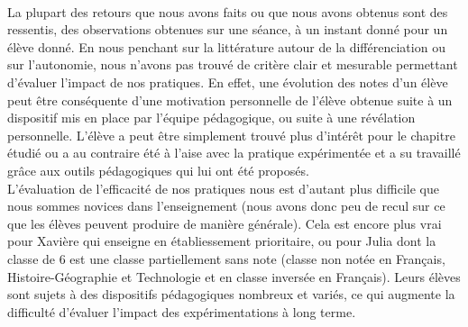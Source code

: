 \paragraph*{} La plupart des retours que nous avons faits ou que nous avons obtenus sont des ressentis, des observations obtenues sur une séance, à un instant donné pour un élève donné. En nous penchant sur la littérature autour de la différenciation ou sur l'autonomie, nous n'avons pas trouvé de critère clair et mesurable permettant d'évaluer l'impact de nos pratiques. En effet, une évolution des notes d'un élève peut être conséquente d'une motivation personnelle de l'élève obtenue suite à un dispositif mis en place par l'équipe pédagogique, ou suite à une révélation personnelle. L'élève a peut être simplement trouvé plus d'intérêt pour le chapitre étudié ou a au contraire été à l'aise avec la pratique expérimentée et a su travaillé grâce aux outils pédagogiques qui lui ont été proposés.\\
L'évaluation de l'efficacité de nos pratiques nous est d'autant plus difficile que nous sommes novices dans l'enseignement (nous avons donc peu de recul sur ce que les élèves peuvent produire de manière générale). Cela est encore plus vrai pour Xavière qui enseigne en établiessement prioritaire, ou pour Julia dont la classe de 6 est une classe partiellement sans note (classe non notée en Français, Histoire-Géographie et Technologie et en classe inversée en Français). Leurs élèves sont sujets à des dispositifs pédagogiques nombreux et variés, ce qui augmente la difficulté d'évaluer l'impact des expérimentations à long terme.

